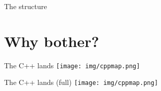 \documentclass[11pt]{beamer}
\begin{document}

\begin{frame}{The structure}
\tableofcontents
\end{frame}


\section{Why bother?}

\begin{frame}{The C++ lands}
\pause
\texttt{[image: img/cppmap.png]}
\end{frame}

\begin{frame}{The C++ lands (full)}
\texttt{[image: img/cppmap.png]}
\end{frame}




\end{document}
